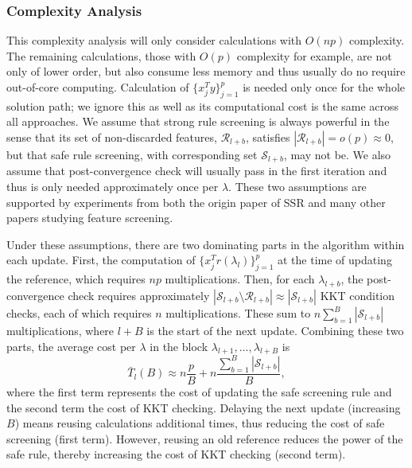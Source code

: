 \subsubsection{Complexity Analysis}
\label{sec:complexity}

This complexity analysis will only consider calculations with $O(np)$ complexity. The remaining calculations, those with $O(p)$ complexity for example, are not only of lower order, but also consume less memory and thus usually do no require out-of-core computing. Calculation of $\{x_j^Ty\}_{j=1}^p$ is needed only once for the whole solution path; we ignore this as well as its computational cost is the same across all approaches. We assume that strong rule screening is always powerful in the sense that its set of non-discarded features, $\mathcal{R}_{l+b}$, satisfies $|\mathcal{R}_{l+b}|=o(p) \approx 0$, but that safe rule screening, with corresponding set $\mathcal{S}_{l+b}$, may not be. We also assume that post-convergence check will usually pass in the first iteration and thus is only needed approximately once per $\lambda$. These two assumptions are supported by experiments from both the origin paper of SSR \citep{Tibshirani2012} and many other papers studying feature screening.

Under these assumptions, there are two dominating parts in the algorithm within each update. First, the computation of $\{x_j^Tr(\lambda_l)\}_{j=1}^p$ at the time of updating the reference, which requires $np$ multiplications. Then, for each $\lambda_{l+b}$, the post-convergence check requires approximately $|\mathcal{S}_{l+b} \setminus \mathcal{R}_{l+b}| \approx |\mathcal{S}_{l+b}|$ KKT condition checks, each of which requires $n$ multiplications. These sum to $n\sum_{b=1}^{B}|\mathcal{S}_{l+b}|$ multiplications, where $l+B$ is the start of the next update. Combining these two parts, the average cost per $\lambda$ in the block $\lambda_{l+1},...,\lambda_{l+B}$ is
\begin{equation}
    \label{eq:cost}
    \bar{T}_l(B) \approx n\frac{p}{B}+n\frac{\sum_{b=1}^B|\mathcal{S}_{l+b}|}{B},
\end{equation}
where the first term represents the cost of updating the safe screening rule and the second term the cost of KKT checking. Delaying the next update (increasing $B$) means reusing calculations additional times, thus reducing the cost of safe screening (first term). However, reusing an old reference reduces the power of the safe rule, thereby increasing the cost of KKT checking (second term).

